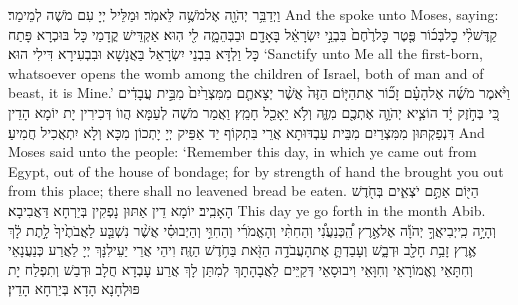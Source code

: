\newperek
{}
{וַיְדַבֵּ֥ר יְהֹוָ֖ה אֶל\maqqaf מֹשֶׁ֥ה לֵּאמֹֽר׃}
{וּמַלֵּיל יְיָ עִם מֹשֶׁה לְמֵימַר׃}
{And the \lord\space spoke unto Moses, saying:}{}
{קַדֶּשׁ\maqqaf לִ֨י כׇל\maqqaf בְּכ֜וֹר פֶּ֤טֶר כׇּל\maqqaf רֶ֙חֶם֙ בִּבְנֵ֣י יִשְׂרָאֵ֔ל בָּאָדָ֖ם וּבַבְּהֵמָ֑ה לִ֖י הֽוּא׃}
{אַקְדֵּישׁ קֳדָמַי כָּל בּוּכְרָא פָּתַח כָּל וַלְדָּא בִּבְנֵי יִשְׂרָאֵל בַּאֲנָשָׁא וּבִבְעִירָא דִּילִי הוּא׃}
{‘Sanctify unto Me all the first-born, whatsoever opens the womb among the children of Israel, both of man and of beast, it is Mine.’}{}
{וַיֹּ֨אמֶר מֹשֶׁ֜ה אֶל\maqqaf הָעָ֗ם זָכ֞וֹר אֶת\maqqaf הַיּ֤וֹם הַזֶּה֙ אֲשֶׁ֨ר יְצָאתֶ֤ם מִמִּצְרַ֙יִם֙ מִבֵּ֣ית עֲבָדִ֔ים כִּ֚י בְּחֹ֣זֶק יָ֔ד הוֹצִ֧יא יְהֹוָ֛ה אֶתְכֶ֖ם מִזֶּ֑ה וְלֹ֥א יֵאָכֵ֖ל חָמֵֽץ׃}
{וַאֲמַר מֹשֶׁה לְעַמָּא הֲווֹ דְּכִירִין יָת יוֹמָא הָדֵין דִּנְפַקְתּוּן מִמִּצְרַיִם מִבֵּית עַבְדּוּתָא אֲרֵי בִּתְקוֹף יַד אַפֵּיק יְיָ יָתְכוֹן מִכָּא וְלָא יִתְאֲכִיל חֲמִיעַ׃}
{And Moses said unto the people: ‘Remember this day, in which ye came out from Egypt, out of the house of bondage; for by strength of hand the \lord\space brought you out from this place; there shall no leavened bread be eaten.}{}
{הַיּ֖וֹם אַתֶּ֣ם יֹצְאִ֑ים בְּחֹ֖דֶשׁ הָאָבִֽיב׃}
{יוֹמָא דֵין אַתּוּן נָפְקִין בְּיַרְחָא דַּאֲבִיבָא׃}
{This day ye go forth in the month Abib.}{}
{וְהָיָ֣ה כִֽי\maqqaf יְבִיאֲךָ֣ יְהֹוָ֡ה אֶל\maqqaf אֶ֣רֶץ הַֽ֠כְּנַעֲנִ֠י וְהַחִתִּ֨י וְהָאֱמֹרִ֜י וְהַחִוִּ֣י וְהַיְבוּסִ֗י אֲשֶׁ֨ר נִשְׁבַּ֤ע לַאֲבֹתֶ֙יךָ֙ לָ֣תֶת לָ֔ךְ אֶ֛רֶץ זָבַ֥ת חָלָ֖ב וּדְבָ֑שׁ וְעָבַדְתָּ֛ אֶת\maqqaf הָעֲבֹדָ֥ה הַזֹּ֖את בַּחֹ֥דֶשׁ הַזֶּֽה׃}
{וִיהֵי אֲרֵי יַעֵילִנָּךְ יְיָ לַאֲרַע כְּנַעֲנָאֵי וְחִתָּאֵי וֶאֱמוֹרָאֵי וְחִוָּאֵי וִיבוּסָאֵי דְּקַיֵּים לַאֲבָהָתָךְ לְמִתַּן לָךְ אֲרַע עָבְדָא חֲלָב וּדְבַשׁ וְתִפְלַח יָת פּוּלְחָנָא הָדָא בְּיַרְחָא הָדֵין׃}
